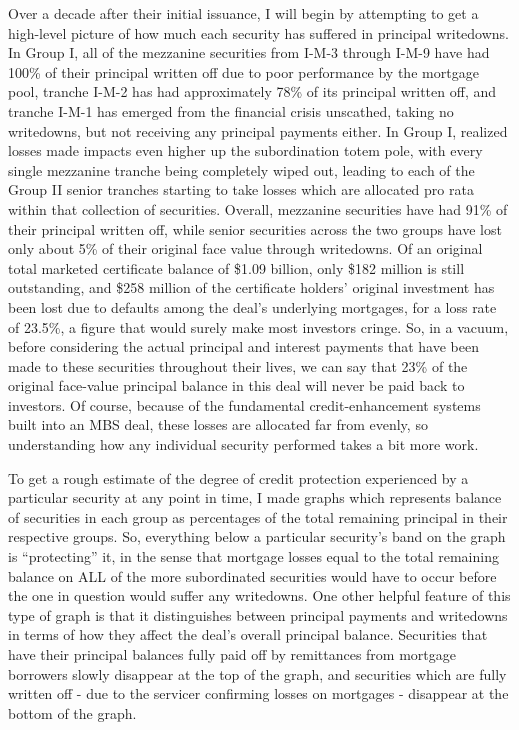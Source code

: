 \documentclass[12pt]{article}
\begin{document}
Over a decade after their initial issuance, I will begin by attempting to get a high-level picture of how much each security has suffered in principal writedowns. In Group I, all of the mezzanine securities from I-M-3 through I-M-9 have had 100\% of their principal written off due to poor performance by the mortgage pool, tranche I-M-2 has had approximately 78\% of its principal written off, and tranche I-M-1 has emerged from the financial crisis unscathed, taking no writedowns, but not receiving any principal payments either. In Group I, realized losses made impacts even higher up the subordination totem pole, with every single mezzanine tranche being completely wiped out, leading to each of the Group II senior tranches starting to take losses which are allocated pro rata within that collection of securities. Overall, mezzanine securities have had 91\% of their principal written off, while senior securities across the two groups have lost only about 5\% of their original face value through writedowns. Of an original total marketed certificate balance of \$1.09 billion, only \$182 million is still outstanding, and \$258 million of the certificate holders’ original investment has been lost due to defaults among the deal’s underlying mortgages, for a loss rate of 23.5\%, a figure that would surely make most investors cringe. So, in a vacuum, before considering the actual principal and interest payments that have been made to these securities throughout their lives, we can say that 23\% of the original face-value principal balance in this deal will never be paid back to investors. Of course, because of the fundamental credit-enhancement systems built into an MBS deal, these losses are allocated far from evenly, so understanding how any individual security performed takes a bit more work.

To get a rough estimate of the degree of credit protection experienced by a particular security at any point in time, I made graphs which represents balance of securities in each group as percentages of the total remaining principal in their respective groups. So, everything below a particular security’s band on the graph is “protecting” it, in the sense that mortgage losses equal to the total remaining balance on ALL of the more subordinated securities would have to occur before the one in question would suffer any writedowns. One other helpful feature of this type of graph is that it distinguishes between principal payments and writedowns in terms of how they affect the deal’s overall principal balance. Securities that have their principal balances fully paid off by remittances from mortgage borrowers slowly disappear at the top of the graph, and securities which are fully written off - due to the servicer confirming losses on mortgages - disappear at the bottom of the graph.
\end{document}
